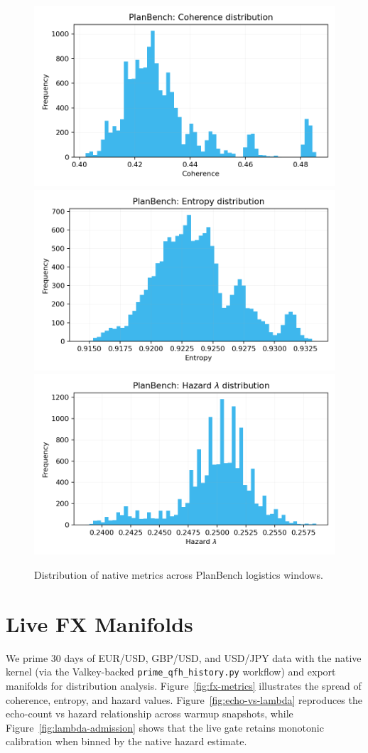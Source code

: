 \documentclass[11pt]{article}
\begin{document}
\begin{figure}[t]
  \centering
  \includegraphics[width=0.32\linewidth]{../figures/planbench_metrics/planbench_coherence_hist.png}
  \includegraphics[width=0.32\linewidth]{../figures/planbench_metrics/planbench_entropy_hist.png}
  \includegraphics[width=0.32\linewidth]{../figures/planbench_metrics/planbench_lambda_hist.png}
  \caption{Distribution of native metrics across PlanBench logistics windows.}
  \label{fig:planbench-metrics}
\end{figure}

\section{Live FX Manifolds}
We prime 30 days of EUR/USD, GBP/USD, and USD/JPY data with the native kernel (via the Valkey-backed \texttt{prime\_qfh\_history.py} workflow) and export manifolds for distribution analysis. Figure~\ref{fig:fx-metrics} illustrates the spread of coherence, entropy, and hazard values. Figure~\ref{fig:echo-vs-lambda} reproduces the echo-count vs hazard relationship across warmup snapshots, while Figure~\ref{fig:lambda-admission} shows that the live gate retains monotonic calibration when binned by the native hazard estimate.
\end{document}
